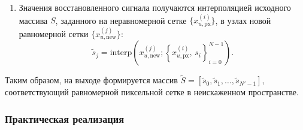 \begin{enumerate}
В используемой реализации принимается $\Delta x = 1$ пиксель.

\item Значения восстановленного сигнала получаются интерполяцией исходного массива $S$, заданного на неравномерной сетке $\{x_{u,\mathrm{px}}^{(i)}\}$, в узлах новой равномерной сетки $\{x_{u,\mathrm{new}}^{(j)}\}$:
\begin{equation}
\tilde{s}_j = \mathrm{interp}\left(x_{u,\mathrm{new}}^{(j)}; \left\{x_{u,\mathrm{px}}^{(i)},\,s_i\right\}_{i=0}^{N-1}\right).
\label{eq:restore_interp_current}
\end{equation}
\end{enumerate}

Таким образом, на выходе формируется массив
$\tilde{S} = [\tilde{s}_0, \tilde{s}_1, \ldots, \tilde{s}_{N'-1}]$,
соответствующий равномерной пиксельной сетке в неискаженном пространстве.

\subsubsection{Практическая реализация}

